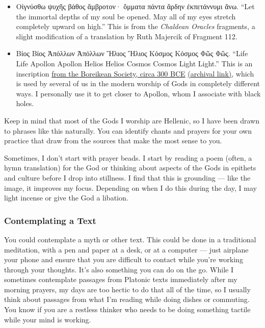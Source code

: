 \documentclass[
]{book}
\providecommand{\tightlist}{%
  \setlength{\itemsep}{0pt}\setlength{\parskip}{0pt}}
\begin{document}
\begin{itemize}
\tightlist
\item
  Οἰγνύσθω ψυχῆς βάθος ἄμβροτον· ὄμματα πάντα ἄρδην ἐκπετάννυμι ἄνω. ``Let the immortal depths of my soul be opened. May all of my eyes stretch completely upward on high.'' This is from the \emph{Chaldean Oracles} fragments, a slight modification of a translation by Ruth Majercik of Fragment 112.
\item
  Βίος Βίος Ἀπόλλων Ἀπόλλων Ἥλιος Ἥλιος Κόσμος Κόσμος Φῶς Φῶς. ``Life Life Apollon Apollon Helios Helios Cosmos Cosmos Light Light.'' This is an inscription \href{http://philipharland.com/greco-roman-associations/dedication-to-bios-life-by-the-boreikian-society-300-bce/}{from the Boreikean Society, circa 300 BCE} \href{https://web.archive.org/web/20210508170106/http://philipharland.com/greco-roman-associations/dedication-to-bios-life-by-the-boreikian-society-300-bce/}{(archival link)}, which is used by several of us in the modern worship of Gods in completely different ways. I personally use it to get closer to Apollon, whom I associate with black holes.
\end{itemize}

Keep in mind that most of the Gods I worship are Hellenic, so I have been drawn to phrases like this naturally. You can identify chants and prayers for your own practice that draw from the sources that make the most sense to you.

Sometimes, I don't start with prayer beads. I start by reading a poem (often, a hymn translation) for the God or thinking about aspects of the Gods in epithets and culture before I drop into stillness. I find that this is grounding --- like the image, it improves my focus. Depending on when I do this during the day, I may light incense or give the God a libation.

\hypertarget{contemplating-a-text}{%
\subsubsection{Contemplating a Text}\label{contemplating-a-text}}

You could contemplate a myth or other text. This could be done in a traditional meditation, with a pen and paper at a desk, or at a computer --- just airplane your phone and ensure that you are difficult to contact while you're working through your thoughts. It's also something you can do on the go. While I sometimes contemplate passages from Platonic texts immediately after my morning prayers, my days are too hectic to do that all of the time, so I usually think about passages from what I'm reading while doing dishes or commuting. You know if you are a restless thinker who needs to be doing something tactile while your mind is working.
\end{document}
